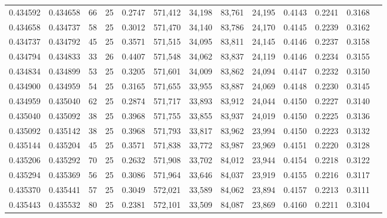 \begin{tabular}{rrrrrrrrrrrrr}
0.434592 & 0.434658 &    66 &  25 &                                     0.2747 & 571,412 &  34,198 &  83,761 &  24,195 & 0.4143 & 0.2241 & 0.3168 \\
0.434658 & 0.434737 &    58 &  25 &                                     0.3012 & 571,470 &  34,140 &  83,786 &  24,170 & 0.4145 & 0.2239 & 0.3162 \\
0.434737 & 0.434792 &    45 &  25 &                                     0.3571 & 571,515 &  34,095 &  83,811 &  24,145 & 0.4146 & 0.2237 & 0.3158 \\
0.434794 & 0.434833 &    33 &  26 &                                     0.4407 & 571,548 &  34,062 &  83,837 &  24,119 & 0.4146 & 0.2234 & 0.3155 \\
0.434834 & 0.434899 &    53 &  25 &                                     0.3205 & 571,601 &  34,009 &  83,862 &  24,094 & 0.4147 & 0.2232 & 0.3150 \\
0.434900 & 0.434959 &    54 &  25 &                                     0.3165 & 571,655 &  33,955 &  83,887 &  24,069 & 0.4148 & 0.2230 & 0.3145 \\
0.434959 & 0.435040 &    62 &  25 &                                     0.2874 & 571,717 &  33,893 &  83,912 &  24,044 & 0.4150 & 0.2227 & 0.3140 \\
0.435040 & 0.435092 &    38 &  25 &                                     0.3968 & 571,755 &  33,855 &  83,937 &  24,019 & 0.4150 & 0.2225 & 0.3136 \\
0.435092 & 0.435142 &    38 &  25 &                                     0.3968 & 571,793 &  33,817 &  83,962 &  23,994 & 0.4150 & 0.2223 & 0.3132 \\
0.435144 & 0.435204 &    45 &  25 &                                     0.3571 & 571,838 &  33,772 &  83,987 &  23,969 & 0.4151 & 0.2220 & 0.3128 \\
0.435206 & 0.435292 &    70 &  25 &                                     0.2632 & 571,908 &  33,702 &  84,012 &  23,944 & 0.4154 & 0.2218 & 0.3122 \\
0.435294 & 0.435369 &    56 &  25 &                                     0.3086 & 571,964 &  33,646 &  84,037 &  23,919 & 0.4155 & 0.2216 & 0.3117 \\
0.435370 & 0.435441 &    57 &  25 &                                     0.3049 & 572,021 &  33,589 &  84,062 &  23,894 & 0.4157 & 0.2213 & 0.3111 \\
0.435443 & 0.435532 &    80 &  25 &                                     0.2381 & 572,101 &  33,509 &  84,087 &  23,869 & 0.4160 & 0.2211 & 0.3104 \\

\end{tabular}
